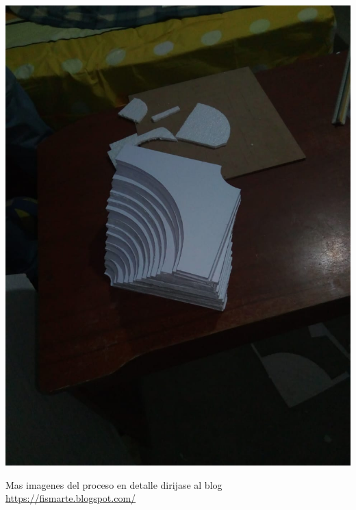 \documentclass[12pt,]{report}
\begin{document}
\includegraphics{g2.jpg}

Mas imagenes del proceso en detalle dirijase al blog \url{https://fismarte.blogspot.com/}


\end{document}

